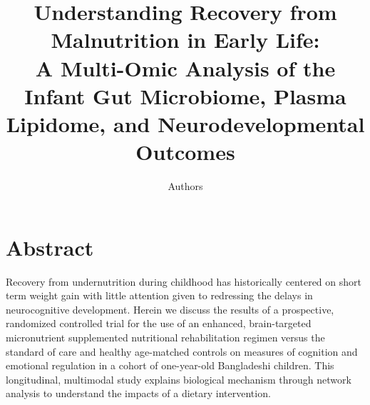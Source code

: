 \documentclass{article}
\title{
  Understanding Recovery from Malnutrition in Early Life:\\
  A Multi-Omic Analysis of the Infant Gut Microbiome, Plasma Lipidome, and Neurodevelopmental Outcomes
}
\author[1]{Authors}
\affil[1]{Affiliations}
\date{}
\begin{document}
\maketitle

\tableofcontents

\newpage
\section{Abstract}
Recovery from undernutrition during childhood has historically centered on short term weight gain with little attention given to redressing the delays in neurocognitive development.
Herein we discuss the results of a prospective, randomized controlled trial for the use of an enhanced, brain-targeted micronutrient supplemented nutritional rehabilitation regimen versus the standard of care and healthy age-matched controls on measures of cognition and emotional regulation in a cohort of one-year-old Bangladeshi children.
This longitudinal, multimodal study explains biological mechanism through network analysis to understand the impacts of a dietary intervention.

\newpage
\end{document}
